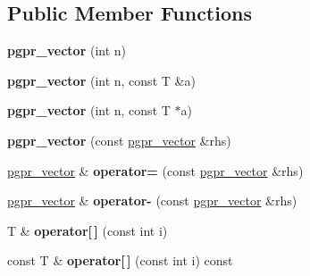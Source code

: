 \subsection*{Public Member Functions}
\begin{DoxyCompactItemize}
\item 
\hypertarget{classpgpr__vector_a4820d76d1faca86e6c3b2eab89b0b142}{{\bfseries pgpr\+\_\+vector} (int n)}\label{classpgpr__vector_a4820d76d1faca86e6c3b2eab89b0b142}

\item 
\hypertarget{classpgpr__vector_a7423667ee0fe3d6b37f648c20ff3e084}{{\bfseries pgpr\+\_\+vector} (int n, const T \&a)}\label{classpgpr__vector_a7423667ee0fe3d6b37f648c20ff3e084}

\item 
\hypertarget{classpgpr__vector_a50c96dc2fbd88b4a9a5ed2a807540422}{{\bfseries pgpr\+\_\+vector} (int n, const T $\ast$a)}\label{classpgpr__vector_a50c96dc2fbd88b4a9a5ed2a807540422}

\item 
\hypertarget{classpgpr__vector_a6135db2460ccc33b4a08b325c25b8517}{{\bfseries pgpr\+\_\+vector} (const \hyperlink{classpgpr__vector}{pgpr\+\_\+vector} \&rhs)}\label{classpgpr__vector_a6135db2460ccc33b4a08b325c25b8517}

\item 
\hypertarget{classpgpr__vector_a989b36f3d36a0ddcbfd44ec45d5b8bde}{\hyperlink{classpgpr__vector}{pgpr\+\_\+vector} \& {\bfseries operator=} (const \hyperlink{classpgpr__vector}{pgpr\+\_\+vector} \&rhs)}\label{classpgpr__vector_a989b36f3d36a0ddcbfd44ec45d5b8bde}

\item 
\hypertarget{classpgpr__vector_ae93d0af7c260a44a6420a1789f5a4c6f}{\hyperlink{classpgpr__vector}{pgpr\+\_\+vector} \& {\bfseries operator-\/} (const \hyperlink{classpgpr__vector}{pgpr\+\_\+vector} \&rhs)}\label{classpgpr__vector_ae93d0af7c260a44a6420a1789f5a4c6f}

\item 
\hypertarget{classpgpr__vector_a3511ec2db47c6a7360286830310396e3}{T \& {\bfseries operator\mbox{[}$\,$\mbox{]}} (const int i)}\label{classpgpr__vector_a3511ec2db47c6a7360286830310396e3}

\item 
\hypertarget{classpgpr__vector_a790cda9d06b190713bf168c28788882c}{const T \& {\bfseries operator\mbox{[}$\,$\mbox{]}} (const int i) const }\label{classpgpr__vector_a790cda9d06b190713bf168c28788882c}


\end{DoxyCompactItemize}
